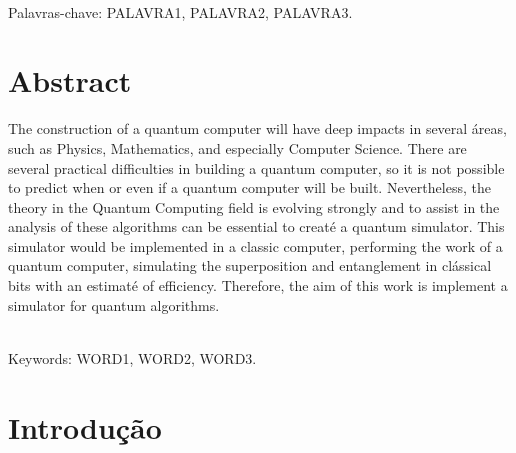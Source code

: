 \documentclass[a4paper, 12pt, oneside]{book}
\begin{document}
\ \\

Palavras-chave: PALAVRA1, PALAVRA2, PALAVRA3. 


\chapter*{Abstract}

\thispagestyle{myheadings}

The construction of a quantum computer will have deep impacts in several áreas, such as Physics, Mathematics, and especially Computer Science. There are several practical difficulties in building a quantum computer, so it is not possible to predict when or even if a quantum computer will be built. Nevertheless, the theory in the Quantum Computing field is evolving strongly and to assist in the analysis of these algorithms can be essential to creaté a quantum simulator. This simulator would be implemented in a classic computer, performing the work of a quantum computer, simulating the superposition and entanglement in clássical bits with an estimaté of efficiency. Therefore, the aim of this work is implement a simulator for quantum algorithms.

\ \\

Keywords: WORD1, WORD2, WORD3.


\tableofcontents

\thispagestyle{myheadings}


\listoffigures
{}

\thispagestyle{myheadings}


\listoftables
{}

\thispagestyle{myheadings}


\pagebreak
{}

\chapter{Introdução}
\thispagestyle{empty}
\end{document}
